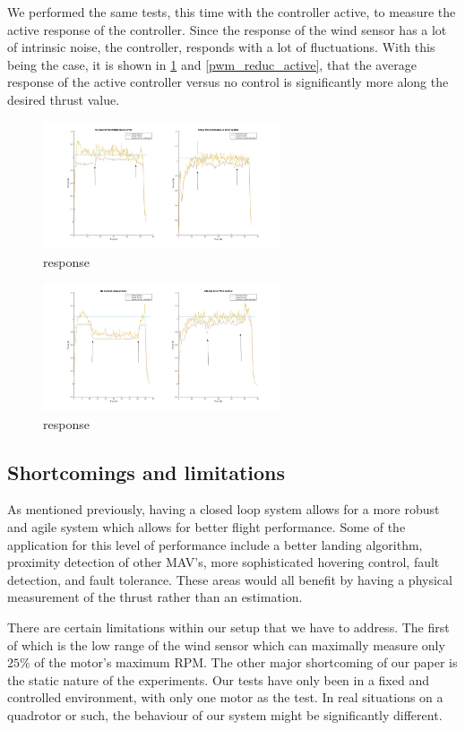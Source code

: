 \documentclass[conference]{IEEEtran}
\begin{document}
We performed the same tests, this time with the controller active, to measure the active response of the controller. Since the response of the wind sensor has a lot of intrinsic noise, the controller, responds with a lot of fluctuations. With this being the case, it is shown in \ref{wind_disturbance} and \ref{pwm_reduc_active}, that the average response of the active controller versus no control is significantly more along the desired thrust value. 
\begin{figure}[htbp]
	\includegraphics[width=7cm]{images/Figure_2/wind_ctl.jpg}
	\caption{response}
	\label{wind_disturbance}
	\end{figure}
\begin{figure}[htbp]
	\includegraphics[width=7cm]{images/Figure_2/pwm_control.jpg}
	\caption{response}
	\label{PWM_control}
\end{figure}

\subsection{Shortcomings and limitations}
As mentioned previously, having a closed loop system allows for a more robust and agile system which allows for better flight performance. Some of the application for this level of performance include a better landing algorithm, proximity detection of other MAV's, more sophisticated hovering control, fault detection, and fault tolerance. These areas would all benefit by having a physical measurement of the thrust rather than an estimation.

There are certain limitations within our setup that we have to address. The first of which is the low range of the wind sensor which can maximally measure only $25\%$ of the motor's maximum RPM. The other major shortcoming of our paper is the static nature of the experiments. Our tests have only been in a fixed and controlled environment, with only one motor as the test. In real situations on a quadrotor or such, the behaviour of our system might be significantly different.  	
\end{document}
